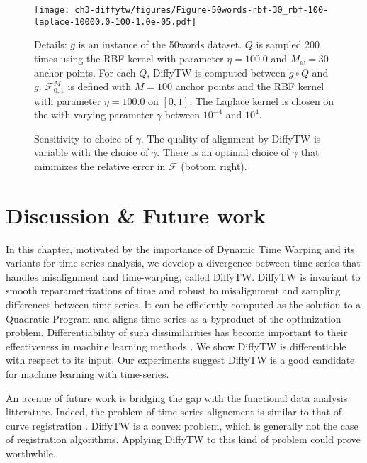 \begin{figure}[ht!]
\label{fig:gamma-sensitivty-50words}
\begin{center}
\texttt{[image: ch3-diffytw/figures/Figure-50words-rbf-30\_rbf-100-laplace-10000.0-100-1.0e-05.pdf]}
\end{center}
\caption[Sensitivity to choice of $\gamma$]{Sensitivity to choice of $\gamma$. The quality of alignment by DiffyTW is variable with the choice of $\gamma$. There is an optimal choice of $\gamma$ that minimizes the relative error in $\mathcal F$ (bottom right).}
\small Details: $g$ is an instance of the 50words dataset.
$Q$ is sampled 200 times using the RBF kernel with parameter $\eta=100.0$ and $M_w=30$ anchor points.
For each $Q$, DiffyTW is computed between $g\circ Q$ and $g$.
$\mathcal F_{0,1}^M$ is defined with $M=100$ anchor points and the RBF kernel with parameter $\eta=100.0$ on $[0,1]$.
The Laplace kernel is chosen on the with varying parameter $\gamma$ between $10^{-4}$ and $10^{4}$.
\end{figure}

\section{Discussion \& Future work}

In this chapter, motivated by the importance of Dynamic Time Warping and its variants for time-series analysis, we develop a divergence between time-series that handles misalignment and time-warping, called DiffyTW. DiffyTW is invariant to smooth reparametrizations of time and robust to misalignment and sampling differences between time series. It can be efficiently computed as the solution to a Quadratic Program and aligns time-series as a byproduct of the optimization problem. Differentiability of such dissimilarities has become important to their effectiveness in machine learning methods \citep{soft-dtw}. We show DiffyTW is differentiable with respect to its input. Our experiments suggest DiffyTW is a good candidate for machine learning with time-series.

An avenue of future work is bridging the gap with the functional data analysis litterature. Indeed, the problem of time-series alignement is similar to that of curve registration \cite{curve-moments}. DiffyTW is a convex problem, which is generally not the case of registration algorithms. Applying DiffyTW to this kind of problem could prove worthwhile.
